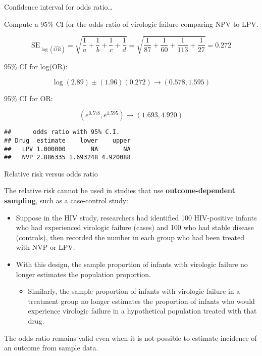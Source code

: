 \documentclass[
  ignorenonframetext,
  aspectratio=169]{beamer}
\newenvironment{Shaded}{\begin{snugshade}}{\end{snugshade}}
\newcommand{\AttributeTok}[1]{\textcolor[rgb]{0.13,0.29,0.53}{#1}}
\newcommand{\FunctionTok}[1]{\textcolor[rgb]{0.13,0.29,0.53}{\textbf{#1}}}
\newcommand{\NormalTok}[1]{#1}
\newcommand{\SpecialCharTok}[1]{\textcolor[rgb]{0.81,0.36,0.00}{\textbf{#1}}}
\newcommand{\StringTok}[1]{\textcolor[rgb]{0.31,0.60,0.02}{#1}}
\providecommand{\tightlist}{%
  \setlength{\itemsep}{0pt}\setlength{\parskip}{0pt}}
\begin{document}
\begin{frame}[fragile]{Confidence interval for odds ratio\ldots{}}
\protect\hypertarget{confidence-interval-for-odds-ratio-1}{}
\small

Compute a 95\% CI for the odds ratio of virologic failure comparing NPV
to LPV.

\[\text{SE}_{\log(\widehat{OR})} = \sqrt{\frac{1}{a} + \frac{1}{b} + \frac{1}{c} + \frac{1}{d}} = \sqrt{\frac{1}{87} + \frac{1}{60} + \frac{1}{113} + \frac{1}{27}} = 0.272\]

95\% CI for log(OR):

\[\log(2.89) \pm (1.96)(0.272) \rightarrow (0.578, 1.595) \]

95\% CI for OR:

\[(e^{0.578}, e^{1.595}) \rightarrow (1.693, 4.920)\]

\scriptsize

\begin{Shaded}
\end{Shaded}

\begin{verbatim}
##      odds ratio with 95% C.I.
## Drug  estimate    lower    upper
##   LPV 1.000000       NA       NA
##   NVP 2.886335 1.693248 4.920088
\end{verbatim}
\end{frame}

\begin{frame}{Relative risk versus odds ratio}
\protect\hypertarget{relative-risk-versus-odds-ratio}{}
\small

The relative risk cannot be used in studies that use
\textbf{outcome-dependent sampling}, such as a case-control study:

\begin{itemize}
\item
  Suppose in the HIV study, researchers had identified 100 HIV-positive
  infants who had experienced virologic failure (cases) and 100 who had
  stable disease (controls), then recorded the number in each group who
  had been treated with NVP or LPV.
\item
  With this design, the sample proportion of infants with virologic
  failure no longer estimates the population proportion.

  \begin{itemize}
  \tightlist
  \item
    Similarly, the sample proportion of infants with virologic failure
    in a treatment group no longer estimates the proportion of infants
    who would experience virologic failure in a hypothetical population
    treated with that drug.
  \end{itemize}
\end{itemize}

The odds ratio remains valid even when it is not possible to estimate
incidence of an outcome from sample data.
\end{frame}
\end{document}
